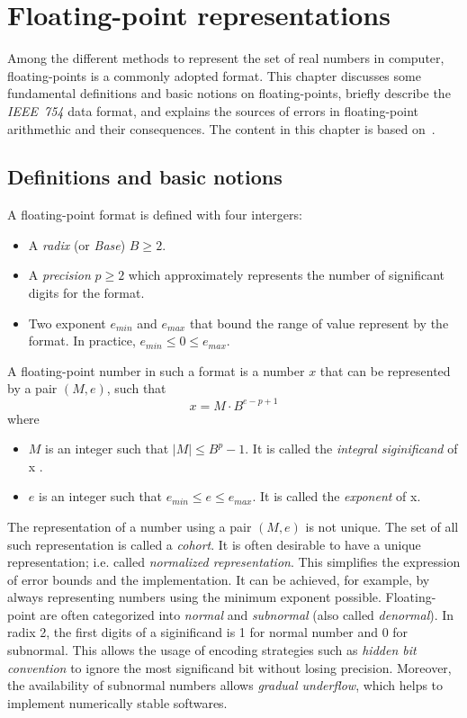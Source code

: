 \chapter{Floating-point representations}
\label{ch:background}
Among the different methods to represent the set of real numbers in computer,
floating-points is a commonly adopted format.
This chapter discusses some fundamental definitions and basic notions on
floating-points, briefly describe the \textit{IEEE~754} data format, and 
explains the sources of errors in floating-point arithmethic and their consequences.
The content in this chapter is based on~\cite{Muller2018-zm}.

\section{Definitions and basic notions}
A floating-point format is defined with four intergers:
\begin{itemize}
	\item A \textit{radix} (or \textit{Base}) $B \ge 2$.
	\item A \textit{precision} $p \ge 2$ which approximately represents the number of significant digits for the format.
	\item Two exponent $e_{min}$ and $e_{max}$ that bound the range of value represent by the format. In practice, $e_{min} \le 0 \le e_{max}$.
\end{itemize}

A floating-point number in such a format is a number $x$ that can be represented by a pair $(M,e)$, such that
\begin{equation}
	x = M \cdot B^{e-p+1}
\end{equation}
where
\begin{itemize}
	\item $M$ is an integer such that $|M| \le B^{p}-1$. It is called the \textit{integral siginificand} of x .
	\item $e$ is an integer such that $e_{min} \le e \le e_{max}$. It is called the \textit{exponent} of x.
\end{itemize}
The representation of a number using a pair $(M, e)$ is not unique.
The set of all such representation is called a \textit{cohort}.
It is often desirable to have a unique representation; i.e. called \textit{normalized representation}.
This simplifies the expression of error bounds and the implementation.
It can be achieved, for example, by always representing numbers using the minimum exponent possible.
Floating-point are often categorized into \textit{normal} and \textit{subnormal} (also called \textit{denormal}).
In radix 2, the first digits of a siginificand is 1 for normal number and 0 for subnormal.
This allows the usage of encoding strategies such as \textit{hidden bit convention} to
ignore the most significand bit without losing precision. 
Moreover, the availability of subnormal numbers allows \textit{gradual underflow},
which helps to implement numerically stable softwares. 

